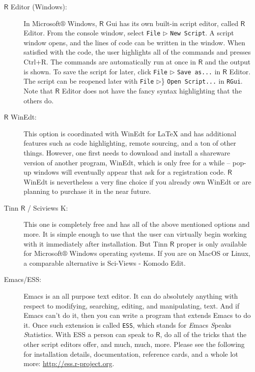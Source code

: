 \documentclass[captions=tableheading]{scrbook}
\begin{document}
\begin{description}
\item[\(\mathsf{R}\) Editor (Windows):] In Microsoft\(\circledR\) Windows, \(\mathsf{R}\) Gui has its own built-in script editor, called \(\mathsf{R}\) Editor. From the console window, select \texttt{File} \(\triangleright\) \texttt{New Script}. A script window opens, and the lines of code can be written in the window. When satisfied with the code, the user highlights all of the commands and presses \textsf{Ctrl+R}. The commands are automatically run at once in \(\mathsf{R}\) and the output is shown. To save the script for later, click \texttt{File} \(\triangleright\) \texttt{Save as...} in \(\mathsf{R}\) Editor. The script can be reopened later with \texttt{File} \(\triangleright\)\} \texttt{Open Script...} in \texttt{RGui}. Note that \(\mathsf{R}\) Editor does not have the fancy syntax highlighting that the others do.
\item[\(\mathsf{R}\) WinEdt:] This option is coordinated with WinEdt for \LaTeX{} and has additional features such as code highlighting, remote sourcing, and a ton of other things. However, one first needs to download and install a shareware version of another program, WinEdt, which is only free for a while -- pop-up windows will eventually appear that ask for a registration code. \(\mathsf{R}\) WinEdt is nevertheless a very fine choice if you already own WinEdt or are planning to purchase it in the near future.
\item[Tinn \(\mathsf{R}\) / Sciviews K:] This one is completely free and has all of the above mentioned options and more. It is simple enough to use that the user can virtually begin working with it immediately after installation. But Tinn \(\mathsf{R}\) proper is only available for Microsoft\(\circledR\) Windows operating systems. If you are on MacOS or Linux, a comparable alternative is Sci-Views - Komodo Edit.
\item[Emacs/ESS:] Emacs is an all purpose text editor. It can do absolutely anything with respect to modifying, searching, editing, and manipulating, text. And if Emacs can't do it, then you can write a program that extends Emacs to do it. Once such extension is called \texttt{ESS}, which stands for \emph{E}macs \emph{S}peaks \emph{S}tatistics. With ESS a person can speak to \(\mathsf{R}\), do all of the tricks that the other script editors offer, and much, much, more. Please see the following for installation details, documentation, reference cards, and a whole lot more: \href{http://ess.r-project.org}{http://ess.r-project.org}.

\end{description}
\end{document}
